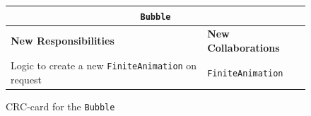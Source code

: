 \documentclass[a4paper]{article}
\begin{document}
\begin{figure}[H]
	\centering
	\begin{tabular}{ | p{8cm} | p{4cm} | }
      \multicolumn{2}{c}{\texttt{Bubble}} \\ \hline
      \textbf{New Responsibilities} & \textbf{New Collaborations} \\ \hline
      Logic to create a new  \texttt{FiniteAnimation} on request & \texttt{FiniteAnimation} \\
      \hline
    \end{tabular}
    \caption{CRC-card for the \texttt{Bubble}}
\end{figure}

%
%
\end{document}
